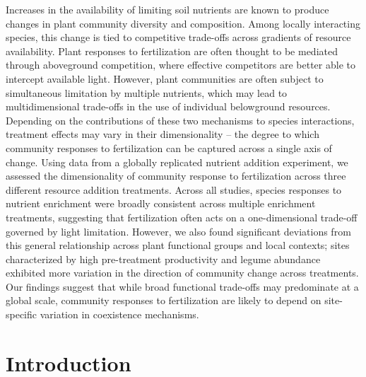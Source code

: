 \documentclass[twoside,12pt,final]{ucthesis-CA2012}
\begin{document}
\begin{ucmainmatter}
Increases in the availability of limiting soil nutrients are known to produce changes in plant community diversity and composition. Among locally interacting species, this change is tied to competitive trade-offs across gradients of resource availability. Plant responses to fertilization are often thought to be mediated through aboveground competition, where effective competitors are better able to intercept available light.
However, plant communities are often subject to simultaneous limitation by multiple nutrients, which may lead to multidimensional trade-offs in the use of individual belowground resources. Depending on the contributions of these two mechanisms to species interactions, treatment effects may vary in their dimensionality -- the degree to which community responses to fertilization can be captured across a single axis of change.
Using data from a globally replicated nutrient addition experiment, we assessed the dimensionality of community response to fertilization across three different resource addition treatments. Across all studies, species responses to nutrient enrichment were broadly consistent across multiple enrichment treatments, suggesting that fertilization often acts on a one-dimensional trade-off governed by light limitation.
However, we also found significant deviations from this general relationship across plant functional groups and local contexts; sites characterized by high pre-treatment productivity and legume abundance exhibited more variation in the direction of community change across treatments. Our findings suggest that while broad functional trade-offs may predominate at a global scale, community responses to fertilization are likely to depend on site-specific variation in coexistence mechanisms.

\hypertarget{introduction}{%
\section{Introduction}\label{introduction}}


\end{ucmainmatter}
\end{document}
